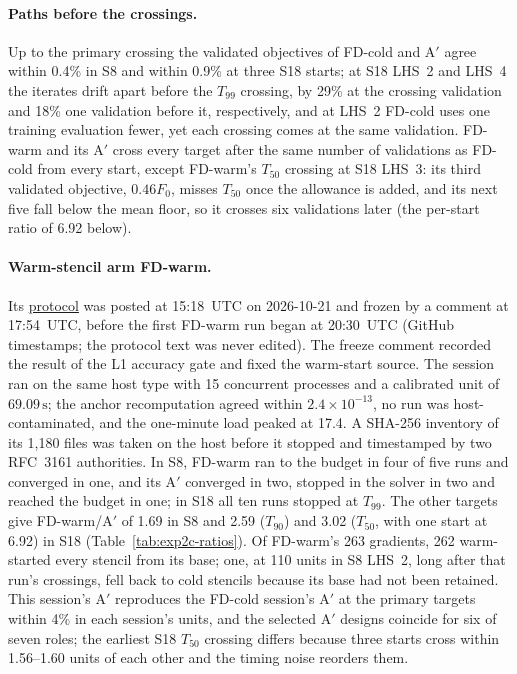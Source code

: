 \documentclass{anvil-paper}
\begin{document}
\begin{table}[H]\centering\small
\caption{Final checks of the ablation's selected designs, as in
Table~\ref{tab:exp2-refinement}: L2 objective, L3 change, the largest
40-angle, tight or shifted change, and the conforming change where stator
offsets are zero.}
\label{tab:exp2b-refinement}
\end{table}

\paragraph{Paths before the crossings.}
Up to the primary crossing the validated objectives of FD-cold and A$'$ agree
within 0.4\% in S8 and within 0.9\% at three S18 starts; at
S18 LHS~2 and LHS~4 the iterates drift apart before the $T_{99}$
crossing, by 29\% at the crossing validation and 18\% one validation
before it, respectively, and at LHS~2 FD-cold uses one training evaluation fewer, yet each
crossing comes at the same validation. FD-warm and its A$'$ cross every
target after the same number of validations as FD-cold from every start, except
FD-warm's $T_{50}$ crossing at S18 LHS~3: its third validated objective,
$0.46F_0$, misses $T_{50}$ once the allowance is added, and its next five
fall below the mean floor, so it crosses six validations later (the
per-start ratio of 6.92 below).

\paragraph{Warm-stencil arm FD-warm.}
Its \href{https://github.com/rjwalters/geode-fem/issues/1224}{protocol} was
posted at 15:18~UTC on 2026-10-21 and frozen by a comment at 17:54~UTC,
before the first FD-warm run began at 20:30~UTC (GitHub timestamps; the
protocol text was never edited). The freeze comment recorded the result of
the L1 accuracy gate and fixed the warm-start source. The session ran on the same host type with
15 concurrent processes and a calibrated unit of $69.09\,\mathrm{s}$; the
anchor recomputation agreed within $2.4\times10^{-13}$, no run was
host-contaminated, and the one-minute load peaked at 17.4. A SHA-256
inventory of its 1,180 files was taken on the host before it stopped and
timestamped by two RFC~3161 authorities. In S8, FD-warm ran to the budget
in four of five runs and converged in one, and its A$'$ converged in two,
stopped in the solver in two and reached the budget in one; in S18 all
ten runs stopped at $T_{99}$. The other targets give FD-warm/A$'$ of 1.69 in
S8 and 2.59 ($T_{90}$) and 3.02 ($T_{50}$, with one start at 6.92) in
S18 (Table~\ref{tab:exp2c-ratios}). Of FD-warm's 263 gradients, 262
warm-started every stencil from its base; one, at 110 units in S8
LHS~2, long after that run's crossings, fell back to cold stencils because
its base had not been retained.
This session's A$'$ reproduces the FD-cold session's A$'$ at the primary targets
within 4\% in each session's units, and the selected A$'$ designs coincide
for six of seven roles; the earliest S18 $T_{50}$ crossing differs
because three starts cross within 1.56--1.60 units of each other and the
timing noise reorders them.
\end{document}
